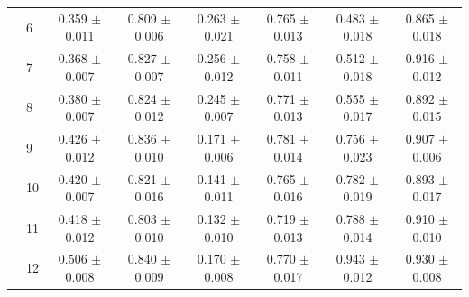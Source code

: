 \begin{longtable}{llcccccc}
 & 6 & 0.359 $\pm$ 0.011 & 0.809 $\pm$ 0.006 & 0.263 $\pm$ 0.021 & 0.765 $\pm$ 0.013 & 0.483 $\pm$ 0.018 & 0.865 $\pm$ 0.018 \\
 & 7 & 0.368 $\pm$ 0.007 & 0.827 $\pm$ 0.007 & 0.256 $\pm$ 0.012 & 0.758 $\pm$ 0.011 & 0.512 $\pm$ 0.018 & 0.916 $\pm$ 0.012 \\
 & 8 & 0.380 $\pm$ 0.007 & 0.824 $\pm$ 0.012 & 0.245 $\pm$ 0.007 & 0.771 $\pm$ 0.013 & 0.555 $\pm$ 0.017 & 0.892 $\pm$ 0.015 \\
 & 9 & 0.426 $\pm$ 0.012 & 0.836 $\pm$ 0.010 & 0.171 $\pm$ 0.006 & 0.781 $\pm$ 0.014 & 0.756 $\pm$ 0.023 & 0.907 $\pm$ 0.006 \\
 & 10 & 0.420 $\pm$ 0.007 & 0.821 $\pm$ 0.016 & 0.141 $\pm$ 0.011 & 0.765 $\pm$ 0.016 & 0.782 $\pm$ 0.019 & 0.893 $\pm$ 0.017 \\
 & 11 & 0.418 $\pm$ 0.012 & 0.803 $\pm$ 0.010 & 0.132 $\pm$ 0.010 & 0.719 $\pm$ 0.013 & 0.788 $\pm$ 0.014 & 0.910 $\pm$ 0.010 \\
 & 12 & 0.506 $\pm$ 0.008 & 0.840 $\pm$ 0.009 & 0.170 $\pm$ 0.008 & 0.770 $\pm$ 0.017 & 0.943 $\pm$ 0.012 & 0.930 $\pm$ 0.008 \\
\end{longtable}
\endgroup
